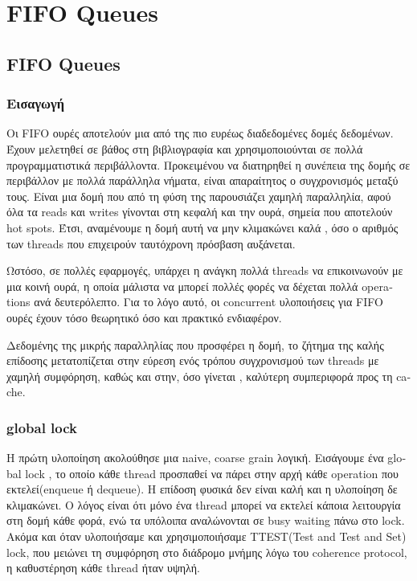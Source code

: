 \def\<#1>{\textit{#1}}

\chapter{\textlatin{FIFO Queues}}
\section{\textlatin{FIFO Queues}}
\subsection{Εισαγωγή}
Οι \textlatin{FIFO} ουρές αποτελούν μια από της πιο ευρέως διαδεδομένες δομές δεδομένων. Έχουν μελετηθεί σε βάθος στη βιβλιογραφία και χρησιμοποιούνται σε πολλά προγραμματιστικά περιβάλλοντα. Προκειμένου να διατηρηθεί η συνέπεια της δομής σε περιβάλλον με πολλά παράλληλα νήματα, είναι απαραίτητος ο συγχρονισμός μεταξύ τους. Είναι μια δομή που από τη φύση της παρουσιάζει χαμηλή παραλληλία, αφού όλα τα \textlatin{reads} και \textlatin{writes} γίνονται στη κεφαλή και την ουρά, σημεία που αποτελούν \textlatin{hot spots}. Έτσι, αναμένουμε η δομή αυτή να μην κλιμακώνει καλά , όσο ο αριθμός των \textlatin{threads} που επιχειρούν ταυτόχρονη πρόσβαση αυξάνεται.

Ωστόσο, σε πολλές εφαρμογές, υπάρχει η ανάγκη πολλά \textlatin{threads} να επικοινωνούν με μια κοινή ουρά, η οποία μάλιστα να μπορεί πολλές φορές να δέχεται πολλά \textlatin{operations} ανά δευτερόλεπτο. Για το λόγο αυτό, οι \textlatin{concurrent}  υλοποιήσεις για \textlatin{FIFO} ουρές έχουν τόσο θεωρητικό όσο και πρακτικό ενδιαφέρον.

Δεδομένης της μικρής παραλληλίας που προσφέρει η δομή, το ζήτημα της καλής επίδοσης μετατοπίζεται στην εύρεση ενός τρόπου συγχρονισμού των \textlatin{threads} με χαμηλή συμφόρηση, καθώς και στην, όσο γίνεται , καλύτερη συμπεριφορά προς τη \textlatin{cache}.

\subsection{\textlatin{global lock}}
H πρώτη υλοποίηση ακολούθησε μια \textlatin{naive, coarse grain} λογική. Εισάγουμε ένα \textlatin{global lock} , το οποίο κάθε \textlatin{thread} προσπαθεί να πάρει στην αρχή κάθε \textlatin{operation} που εκτελεί(\textlatin{enqueue} ή \textlatin{dequeue}). Η επίδοση φυσικά δεν είναι  καλή και  η υλοποίηση δε κλιμακώνει. Ο λόγος είναι ότι μόνο ένα \textlatin{thread}  μπορεί να εκτελεί κάποια λειτουργία στη δομή κάθε φορά, ενώ τα υπόλοιπα αναλώνονται σε \textlatin{busy waiting} πάνω στο \textlatin{lock}. Ακόμα και όταν υλοποιήσαμε και χρησιμοποιήσαμε \textlatin{TTEST(Test and Test and Set) lock}, που μειώνει τη συμφόρηση στο διάδρομο μνήμης λόγω του \textlatin{coherence protocol}, η καθυστέρηση κάθε \textlatin{thread} ήταν υψηλή.

